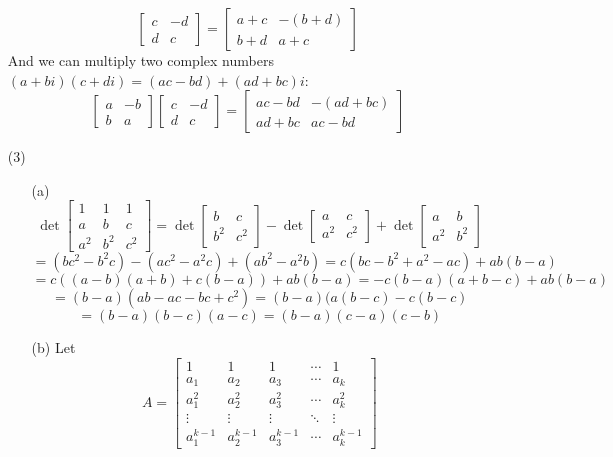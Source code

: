 \documentclass[12pt]{article}
\begin{document}
\begin{itemize}
$$\begin{bmatrix}
c & -d \\
d & c
\end{bmatrix} = \begin{bmatrix}
a + c & -(b + d) \\
b + d & a + c
\end{bmatrix}$$
And we can multiply two complex numbers $(a + bi)(c + di) = (ac - bd) + (ad + bc)i$:
$$\begin{bmatrix}
a & -b \\
b & a
\end{bmatrix}\begin{bmatrix}
c & -d \\
d & c
\end{bmatrix} = \begin{bmatrix}
ac - bd & -(ad + bc) \\
ad + bc & ac - bd
\end{bmatrix}$$
\item[(3)]
\begin{itemize}
\item[(a)]
$$\det\begin{bmatrix}
1 & 1 & 1 \\
a & b & c \\
a^2 & b^2 & c^2
\end{bmatrix} = \det\begin{bmatrix}
b & c \\
b^2 & c^2
\end{bmatrix} - \det\begin{bmatrix}
a & c \\
a^2 & c^2
\end{bmatrix} + \det\begin{bmatrix}
a & b \\
a^2 & b^2
\end{bmatrix}$$
$$= (bc^2 - b^2c) - (ac^2 - a^2c) + (ab^2 - a^2b) = c(bc  - b^2 + a^2 - ac) + ab(b - a)$$
$$= c((a - b)(a + b) + c(b - a)) + ab(b - a) = -c(b - a)(a + b - c) + ab(b - a)$$
$$= (b - a)(ab - ac - bc + c^2) = (b - a)(a(b - c) - c(b - c)$$
$$= (b - a)(b - c)(a - c) = (b - a)(c - a)(c - b)$$
\item[(b)]
Let 
$$A = \begin{bmatrix}
1 & 1 & 1 & \cdots & 1 \\
a_1 & a_2 & a_3 & \cdots & a_k \\
a_1^2 & a_2^2 & a_3^2 & \cdots & a_k^2 \\
\vdots & \vdots & \vdots & \ddots & \vdots \\
a_1^{k-1} & a_2^{k-1} & a_3^{k-1} & \cdots & a_k^{k-1}

\end{bmatrix}$$
\end{itemize}
\end{itemize}
\end{document}
